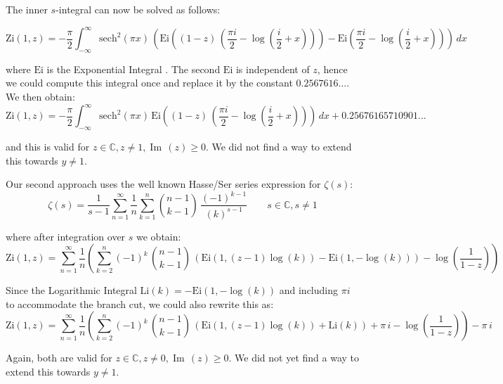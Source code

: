 \documentclass[a4paper,11pt,twoside]{amsart}
\newcommand\Ei{\mathrm{Ei}}
\newcommand\Li{\mathrm{Li}}
\newcommand\Zi{\mathrm{Zi}}
\newcommand\sech{\mathrm{sech}}
\renewcommand\Im{{\operatorname{Im\,}}}
\begin{document}
The inner $s$-integral can now be solved as follows:

\begin{equation}\label{zetcom3}
  \Zi(1,z) = -\frac{\pi}{2}\int_{-\infty}^{\infty} \sech^2(\pi x)\, \left( \Ei\left((1-z)\, \left(\frac{\pi i}{2}-\log\left(\frac{i}{2}+x\right) \right) \right) -\Ei\left(\frac{\pi i}{2}-\log \left(\frac{i}{2}+x\right) \right) \right) \, dx
\end{equation}

where $\Ei$ is the Exponential Integral \cite{expi}. The second $\Ei$ is independent of $z$, hence we could compute this integral once and replace it by the constant $0.2567616...$. We then obtain:
\begin{equation}\label{zetcom4}
  \Zi(1,z) = -\frac{\pi}{2}\int_{-\infty}^{\infty} \sech^2(\pi x)\, \Ei\left((1-z)\, \left(\frac{\pi i}{2}-\log\left(\frac{i}{2}+x\right) \right) \right)\, dx + 0.25676165710901...
\end{equation}

and this is valid for $z \in \mathbb{C}, z \ne 1, \Im(z) \ge 0$. We did not find a way to extend this towards $y \ne 1$.

Our second approach uses the well known Hasse/Ser series expression \cite{hase} for $\zeta(s)$:
\begin{equation}\label{zetcom5}
  \zeta(s) = \frac{1}{s-1} \sum_{n=1}^{\infty} \frac{1}{n} \sum_{k=1}^n \binom{n-1}{k-1}\,\frac{(-1)^{k-1}}{(k)^{s-1}} \qquad s \in \mathbb{C}, s \ne 1
\end{equation}

where after integration over $s$ we obtain:
\begin{equation}\label{zetcom6}
  \Zi(1,z) =\sum_{n=1}^{\infty} \frac{1}{n} \left(\sum_{k=2}^n(-1)^k\, \binom{n-1}{k-1}\,\left(\Ei\left(1,(z-1)\log(k)\right)-\Ei\left(1,-\log(k)\right)  \right)-\log\left(\frac{1}{1-z}\right)\right)
\end{equation}

Since the Logarithmic Integral $\Li(k) = -\Ei\left(1,-\log(k)\right)$ \cite{logi} and including $\pi i$ to accommodate the branch cut, we could also rewrite this as:
\begin{equation}\label{zetcom7}
  \Zi(1,z) = \sum_{n=1}^{\infty} \frac{1}{n}\left( \sum_{k=2}^n(-1)^k\, \binom{n-1}{k-1}\,\left(\Ei\left(1,(z-1)\log(k)\right)+\Li(k)\right) +\pi\,i -\log\left(\frac{1}{1-z}\right) \right) -\pi\,i
\end{equation}

Again, both are valid for $z \in \mathbb{C}, z \ne 0, \Im(z) \ge 0$. We did not yet find a way to extend this towards $y \ne 1$.
\end{document}
